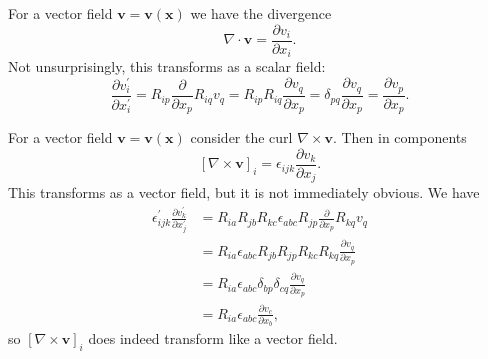 \begin{example}
    For a vector field $\mathbf{v}=\mathbf{v}(\mathbf{x})$ we have the divergence
    \[
    \nabla \cdot \mathbf{v}=\frac{\partial v_{i}}{\partial x_{i}}.
    \]
    Not unsurprisingly, this transforms as a scalar field:
    \[
    \frac{\partial v_{i}^{\prime}}{\partial x_{i}^{\prime}}=R_{i p} \frac{\partial}{\partial x_{p}} R_{i q} v_{q}=R_{i p} R_{i q} \frac{\partial v_{q}}{\partial x_{p}}=\delta_{p q} \frac{\partial v_{q}}{\partial x_{p}}=\frac{\partial v_{p}}{\partial x_{p}}.
    \]
\end{example}
\begin{example}
    For a vector field $\mathbf{v}=\mathbf{v}(\mathbf{x})$ consider the curl $\nabla \times \mathbf{v}$. Then in components
    \[
    [\nabla \times \mathbf{v}]_{i}=\epsilon_{i j k} \frac{\partial v_{k}}{\partial x_{j}}.
    \]
    This transforms as a vector field, but it is not immediately obvious. We have
    \[
    \begin{aligned}
    \epsilon_{i j k}^{\prime} \frac{\partial v_{k}^{\prime}}{\partial x_{j}^{\prime}} &=R_{i a} R_{j b} R_{k c} \epsilon_{a b c} R_{j p} \frac{\partial}{\partial x_{p}} R_{k q} v_{q} \\
    &=R_{i a} \epsilon_{a b c} R_{j b} R_{j p} R_{k c} R_{k q} \frac{\partial v_{q}}{\partial x_{p}} \\
    &=R_{i a} \epsilon_{a b c} \delta_{b p} \delta_{c q} \frac{\partial v_{q}}{\partial x_{p}} \\
    &=R_{i a} \epsilon_{a b c} \frac{\partial v_{c}}{\partial x_{b}},
    \end{aligned}
    \]
    so $[\nabla \times \mathbf{v}]_{i}$ does indeed transform like a vector field.
\end{example}

